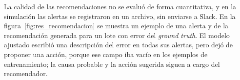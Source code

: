 La calidad de las recomendaciones no se evaluó de forma cuantitativa, y en la simulación las alertas se registraron en un archivo, sin enviarse a Slack. En la figura~\ref{fig:res_recomendacion} se muestra un ejemplo de una alerta y de la recomendación generada para un lote con error del \textit{ground truth}. El modelo ajustado escribió una descripción del error en todas sus alertas, pero dejó de proponer una acción, porque ese campo iba vacío en los ejemplos de entrenamiento; la causa probable y la acción sugerida siguen a cargo del recomendador.

